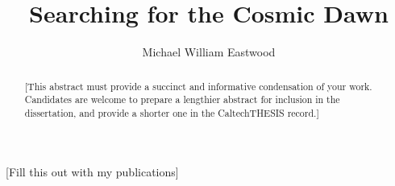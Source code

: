\documentclass[12pt]{caltech_thesis}
\begin{document}
\title{Searching for the Cosmic Dawn}
\author{Michael William Eastwood}

\address{Pasadena, California}                     %



\maketitle[logo]

\begin{acknowledgements}
\end{acknowledgements}

\begin{abstract}
    [This abstract must provide a succinct and informative condensation of your work. Candidates are welcome to prepare a lengthier abstract for inclusion in the dissertation, and provide a shorter one in the CaltechTHESIS record.]
\end{abstract}


[Fill this out with my publications]

\tableofcontents
\listoffigures
\listoftables

\mainmatter







\end{document}
